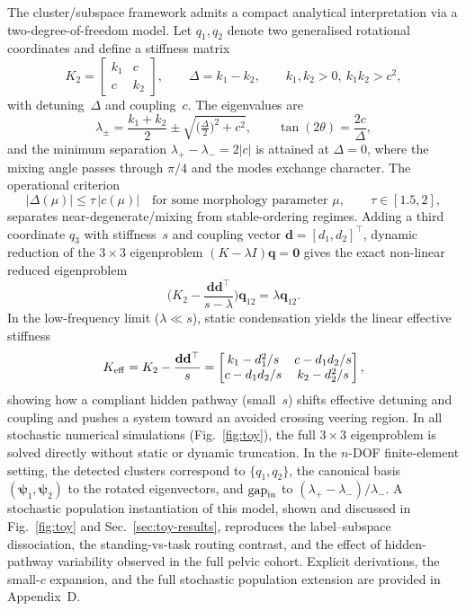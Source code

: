 \documentclass[11pt]{article}
\begin{document}
The cluster/subspace framework admits a compact analytical interpretation via a two-degree-of-freedom model.
Let $q_1,q_2$ denote two generalised rotational coordinates and define a stiffness matrix
\begin{equation}
K_2=\begin{bmatrix} k_1 & c\\ c & k_2\end{bmatrix},\qquad \Delta=k_1-k_2,\qquad k_1,k_2>0,\ k_1k_2>c^2,
\end{equation}
with detuning~$\Delta$ and coupling~$c$.
The eigenvalues are
\begin{equation}
\lambda_{\pm}=\frac{k_1+k_2}{2}\pm\sqrt{\Big(\tfrac{\Delta}{2}\Big)^2+c^2},
\qquad
\tan(2\theta)=\frac{2c}{\Delta},
\label{eq:2dof-eig}
\end{equation}
and the minimum separation $\lambda_+-\lambda_-=2|c|$ is attained at $\Delta=0$, where the mixing angle passes through $\pi/4$ and the modes exchange character.
The operational criterion
\begin{equation}
|\Delta(\mu)|\le\tau\,|c(\mu)|\quad\text{for some morphology parameter }\mu,\qquad \tau\in[1.5,2],
\label{eq:2dof-criterion}
\end{equation}
separates near-degenerate/mixing from stable-ordering regimes.
Adding a third coordinate $q_3$ with stiffness~$s$ and coupling vector $\mathbf d = [d_1, d_2]^\top$, dynamic reduction of the $3\times 3$ eigenproblem $(K - \lambda I)\mathbf q = \mathbf 0$ gives the exact non-linear reduced eigenproblem
\begin{equation}
\Big( K_2 - \frac{\mathbf d \mathbf d^\top}{s - \lambda} \Big) \mathbf q_{12} = \lambda \mathbf q_{12}.
\label{eq:dynamic-schur}
\end{equation}
In the low-frequency limit ($\lambda \ll s$), static condensation yields the linear effective stiffness
\begin{equation}
K_{\rm eff} = K_2 - \frac{\mathbf d \mathbf d^\top}{s} = \begin{bmatrix} k_1-d_1^2/s & c-d_1d_2/s\\ c-d_1d_2/s & k_2-d_2^2/s\end{bmatrix},
\label{eq:schur}
\end{equation}
showing how a compliant hidden pathway (small~$s$) shifts effective detuning and coupling and pushes a system toward an avoided crossing veering region.
In all stochastic numerical simulations (Fig.~\ref{fig:toy}), the full $3\times 3$ eigenproblem is solved directly without static or dynamic truncation.
In the $n$-DOF finite-element setting, the detected clusters correspond to $\{q_1,q_2\}$, the canonical basis $(\boldsymbol\psi_1,\boldsymbol\psi_2)$ to the rotated eigenvectors, and $\mathrm{gap}_{\rm in}$ to $(\lambda_+-\lambda_-)/\lambda_-$.
A stochastic population instantiation of this model, shown and discussed in Fig.~\ref{fig:toy} and Sec.~\ref{sec:toy-results}, reproduces the label--subspace dissociation, the standing-vs-task routing contrast, and the effect of hidden-pathway variability observed in the full pelvic cohort.
Explicit derivations, the small-$c$ expansion, and the full stochastic population extension are provided in Appendix~D.
\end{document}
